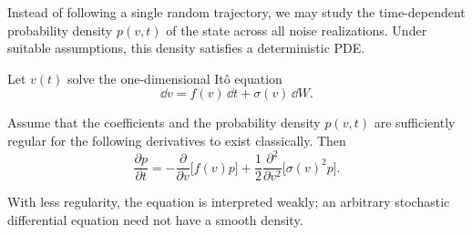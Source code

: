 Instead of following a single random trajectory, we may study the time-dependent probability density $p(v,t)$ of the state across all noise realizations. Under suitable assumptions, this density satisfies a deterministic PDE.

\begin{theorem}
\label{thm:fokker-planck}
Let $v(t)$ solve the one-dimensional It\^o equation
\[
\dd v=f(v)\,\dd t+\sigma(v)\,\dd W.
\]

Assume that the coefficients and the probability density $p(v,t)$ are sufficiently regular for the following derivatives to exist classically. Then
\begin{equation}
\frac{\partial p}{\partial t}
=-\frac{\partial}{\partial v}\big[f(v)p\big]
+\frac12\frac{\partial^2}{\partial v^2}\big[\sigma(v)^2p\big].
\end{equation}

With less regularity, the equation is interpreted weakly; an arbitrary stochastic differential equation need not have a smooth density.
\end{theorem}

